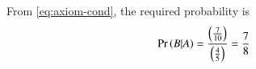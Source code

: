 From 
\eqref{eq:axiom-cond},
the required probability is
\begin{align}
	\Pr\left(B|A\right) = \frac{\left(\frac{7}{10}\right)}{\left(\frac{4}{5}\right)}
           &= \frac{7}{8}
\end{align}

